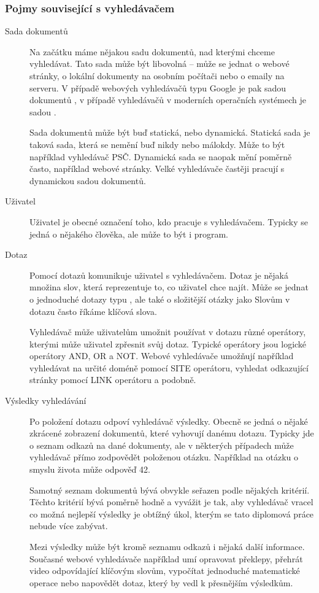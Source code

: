 \documentclass[12pt]{article}
\begin{document}
\subsubsection{Pojmy související s vyhledávačem}
\begin{description}
\item[Sada dokumentů] Na začátku máme nějakou sadu dokumentů, nad kterými chceme vyhledávat. Tato sada může být libovolná -- může se jednat o webové stránky, o lokální dokumenty na osobním počítači nebo o emaily na serveru. V případě webových vyhledávačů typu Google je pak sadou dokumentů , v případě vyhledávačů v moderních operačních systémech je sadou . 

Sada dokumentů může být buď statická, nebo dynamická. Statická sada je taková sada, která se nemění buď nikdy nebo málokdy. Může to být například vyhledávač PSČ. Dynamická sada se naopak mění poměrně často, například webové stránky. Velké vyhledávače častěji pracují s dynamickou sadou dokumentů. 
\item[Uživatel] Uživatel je obecné označení toho, kdo pracuje s vyhledávačem. Typicky se jedná o nějakého člověka, ale může to být i program. 
\item[Dotaz] Pomocí dotazů komunikuje uživatel s vyhledávačem. Dotaz je nějaká množina slov, která reprezentuje to, co uživatel chce najít. Může se jednat o jednoduché dotazy typu , ale také o složitější otázky jako  Slovům v dotazu často říkáme klíčová slova. 

Vyhledávač může uživatelům umožnit používat v dotazu různé operátory, kterými může uživatel zpřesnit svůj dotaz. Typické operátory jsou logické operátory AND, OR a NOT. Webové vyhledávače umožňují například vyhledávat na určité doméně pomocí SITE operátoru, vyhledat odkazující stránky pomocí LINK operátoru a podobně. 
\item[Výsledky vyhledávání] Po položení dotazu odpoví vyhledávač výsledky. Obecně se  jedná o nějaké zkrácené zobrazení dokumentů, které vyhovují danému dotazu. Typicky jde o seznam odkazů na dané dokumenty, ale v některých případech může vyhledávač přímo zodpovědět položenou otázku. Například na otázku o smyslu života může odpověď 42. 

Samotný seznam dokumentů bývá obvykle seřazen podle nějakých kritérií. Těchto kritérií bývá poměrně hodně a vyvážit je tak, aby vyhledávač vracel co možná nejlepší výsledky je obtížný úkol, kterým se tato diplomová práce nebude více zabývat. 

Mezi výsledky může být kromě seznamu odkazů i nějaká další informace. Současné webové vyhledávače například umí opravovat překlepy, přehrát video odpovídající klíčovým slovům, vypočítat jednoduché matematické operace nebo napovědět dotaz, který by vedl k přesnějším výsledkům. 
\end{description}
\end{document}
